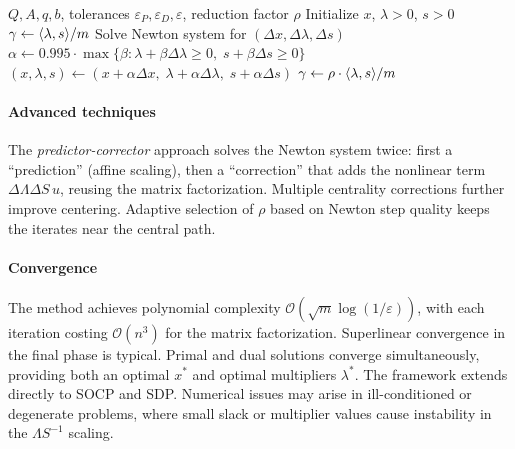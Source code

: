 \begin{algorithm}
	\caption{Primal-Dual Interior Point Method (IPMQP)}
	\label{alg:ipmqp}
	\begin{algorithmic}[1]
		\Require $Q, A, q, b$, tolerances $\varepsilon_P, \varepsilon_D, \varepsilon$, reduction factor $\rho$
			\State Initialize $x$, $\lambda > 0$, $s > 0$
			\State $\gamma \gets \langle\lambda, s\rangle / m$
				\State Solve Newton system for $(\Delta x, \Delta\lambda, \Delta s)$
				\State $\alpha \gets 0.995 \cdot \max\{\beta : \lambda + \beta\Delta\lambda \geq 0,\; s + \beta\Delta s \geq 0\}$
				\State $(x, \lambda, s) \gets (x + \alpha\Delta x,\; \lambda + \alpha\Delta\lambda,\; s + \alpha\Delta s)$
				\State $\gamma \gets \rho \cdot \langle\lambda, s\rangle / m$
			\EndWhile
		\EndProcedure
	\end{algorithmic}
\end{algorithm}

\paragraph{Advanced techniques}

The \emph{predictor-corrector} approach solves the Newton system twice: first a ``prediction'' (affine scaling), then a ``correction'' that adds the nonlinear term $\Delta\Lambda\Delta S\, u$, reusing the matrix factorization.
Multiple centrality corrections further improve centering.
Adaptive selection of $\rho$ based on Newton step quality keeps the iterates near the central path.

\paragraph{Convergence}

The method achieves polynomial complexity $\mathcal{O}(\sqrt{m}\log(1/\varepsilon))$, with each iteration costing $\mathcal{O}(n^3)$ for the matrix factorization.
Superlinear convergence in the final phase is typical.
Primal and dual solutions converge simultaneously, providing both an optimal $x^*$ and optimal multipliers $\lambda^*$.
The framework extends directly to SOCP and SDP.
Numerical issues may arise in ill-conditioned or degenerate problems, where small slack or multiplier values cause instability in the $\Lambda S^{-1}$ scaling.